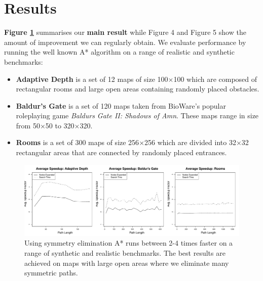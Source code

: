 \section{Results}

\textbf{Figure \ref{fig:speedup}} summarises our \textbf{main result} while Figure
4 and Figure 5 show the amount of improvement we
can regularly obtain. We evaluate performance by running the well known A* algorithm on a range of realistic and synthetic benchmarks:
\begin{itemize}
\item{
\textbf{Adaptive Depth} is a set of 12 maps of size 100$\times$100 which are
composed of rectangular rooms and large open areas containing randomly placed obstacles.
}
\item{
\textbf{Baldur's Gate} is a set of 120 maps taken from BioWare's popular
roleplaying game \emph{Baldurs Gate II: Shadows of Amn}. 
These maps range in size from 50$\times$50 to 320$\times$320.
}
\item{
\textbf{Rooms} is a set of 300 maps of size 256$\times$256 which are divided into 32$\times$32
rectangular areas that are connected by randomly placed entrances.
}
\end{itemize}


\vspace{1em}
\begin{figure}[h]
\label{fig:speedup}
\begin{center}
\includegraphics[width=\columnwidth]{diagrams/speedup}
\caption{Using symmetry elimination A* runs between 2-4 times faster on a range of synthetic
and realistic benchmarks.
The best results are achieved on maps with large open areas where we eliminate
many symmetric paths.}
\end{center}
\end{figure}

